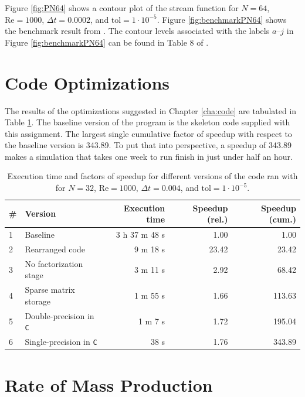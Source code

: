 Figure \ref{fig:PN64} shows a contour plot of the stream function for $N = 64$, $\text{Re} = 1000$, $\Delta t = 0.0002$, and $\text{tol} = 1 \cdot 10^{-5}$. Figure \ref{fig:benchmarkPN64} shows the benchmark result from \parencite{botella1998benchmark}. The contour levels associated with the labels $a$--$j$ in Figure \ref{fig:benchmarkPN64} can be found in Table 8 of \parencite{botella1998benchmark}.

\section{Code Optimizations}

The results of the optimizations suggested in Chapter \ref{cha:code} are tabulated in Table \ref{tab:results1}. The baseline version of the program is the skeleton code supplied with this assignment. The largest single cumulative factor of speedup with respect to the baseline version is 343.89. To put that into perspective, a speedup of 343.89 makes a simulation that takes one week to run finish in just under half an hour.
\begin{table}[h]
    \centering
    \begin{tabular}{llrrr}  
        \toprule
        \# & Version & Execution time & Speedup (rel.) & Speedup (cum.) \\
        \midrule
        1 & Baseline & 3 h 37 m 48 s & 1.00 & 1.00 \\
        2 & Rearranged code & 9 m 18 s & 23.42 & 23.42 \\
        3 & No factorization stage & 3 m 11 s & 2.92 & 68.42 \\
        4 & Sparse matrix storage & 1 m 55 s & 1.66 & 113.63 \\
        5 & Double-precision in \texttt{C} & 1 m 7 s & 1.72 & 195.04 \\
        6 & Single-precision in \texttt{C} & 38 s & 1.76 & 343.89 \\
        \bottomrule
    \end{tabular}
    \caption{Execution time and factors of speedup for different versions of the code ran with for $N = 32$, $\text{Re} = 1000$, $\Delta t = 0.004$, and $\text{tol} = 1 \cdot 10^{-5}$.}
    \label{tab:results1} 
\end{table}

\section{Rate of Mass Production}

